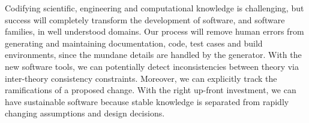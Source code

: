 \documentclass[sigconf,review]{acmart}
\begin{document}
Codifying scientific, engineering and computational knowledge is challenging,
but success will completely transform the development of software, and software
families, in well understood domains. Our process will remove human errors from
generating and maintaining documentation, code, test cases and build
environments, since the mundane details are handled by the generator.  With the
new software tools, we can potentially detect inconsistencies between theory via
inter-theory consistency constraints. Moreover, we can explicitly track the
ramifications of a proposed change.  With the right up-front investment, we can
have sustainable software because stable knowledge is separated from rapidly
changing assumptions and design decisions.



\end{document}
